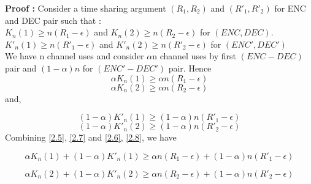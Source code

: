 \documentclass{article}
\begin{document}
\textbf{Proof :}  Consider a time sharing argument $\left(R_1, R_2 \right)$ and  $\left(R'_1, R'_2 \right)$ for ENC and DEC pair such that :\\
 $K_{n}(1) \geq n\left( R_1 - \epsilon \right)$ and $K_{n}(2) \geq n\left( R_2 - \epsilon \right)$ for $\left( ENC, DEC \right)$.
  $K'_{n}(1) \geq n\left( R'_1 - \epsilon \right)$ and $K'_{n}(2) \geq n\left( R'_2 - \epsilon \right)$ for $\left( ENC', DEC' \right)$ \\
  We have n channel uses and consider $\alpha$n  channel uses by first  $\left( ENC-DEC \right)$ pair and $\left(1 -\alpha \right)n$ for  $\left( ENC'-DEC' \right)$ pair. Hence
  \begin{equation}
  	  \alpha K_{n}(1) \geq \alpha n\left( R_1 - \epsilon \right) \label{2.5}
  	\end{equation}
    \begin{equation}
\alpha K_{n}(2) \geq   \alpha n\left( R_2 - \epsilon \right) \label{2.6}
  \end{equation}
 and,
  
  \begin{equation}
	\left(1 - \alpha  \right)  K'_{n}(1) \geq \left(1 - \alpha  \right) n\left( R'_1 - \epsilon \right) \label{2.7}
\end{equation}
\begin{equation}
	\left(1 - \alpha  \right) K'_{n}(2) \geq   \left(1 - \alpha  \right)n\left( R'_2 - \epsilon \right) \label{2.8}
\end{equation}
   Combining \eqref{2.5}, \eqref{2.7} and \eqref{2.6}, \eqref{2.8}, we have 
 
\begin{equation}
	\alpha K_{n}(1)	+ \left(1 - \alpha  \right) K'_{n}(1) \geq   \alpha n\left( R_1 - \epsilon \right) +  \left(1 - \alpha  \right)n\left( R'_1 - \epsilon \right) \label{2.9
	}
\end{equation}   
  
\begin{equation}
 \alpha K_{n}(2)	+ \left(1 - \alpha  \right) K'_{n}(2) \geq   \alpha n\left( R_2 - \epsilon \right) +  \left(1 - \alpha  \right)n\left( R'_2 - \epsilon \right) \label{2.10}
\end{equation}  
  
\end{document}
